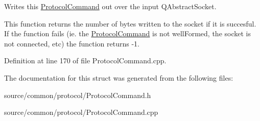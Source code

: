 Writes this \hyperlink{struct_picto_1_1_protocol_command}{Protocol\-Command} out over the input Q\-Abstract\-Socket. 

This function returns the number of bytes written to the socket if it is succesful. If the function fails (ie. the \hyperlink{struct_picto_1_1_protocol_command}{Protocol\-Command} is not well\-Formed, the socket is not connected, etc) the function returns -\/1. 

Definition at line 170 of file Protocol\-Command.\-cpp.



The documentation for this struct was generated from the following files\-:\begin{DoxyCompactItemize}
\item 
source/common/protocol/Protocol\-Command.\-h\item 
source/common/protocol/Protocol\-Command.\-cpp\end{DoxyCompactItemize}
